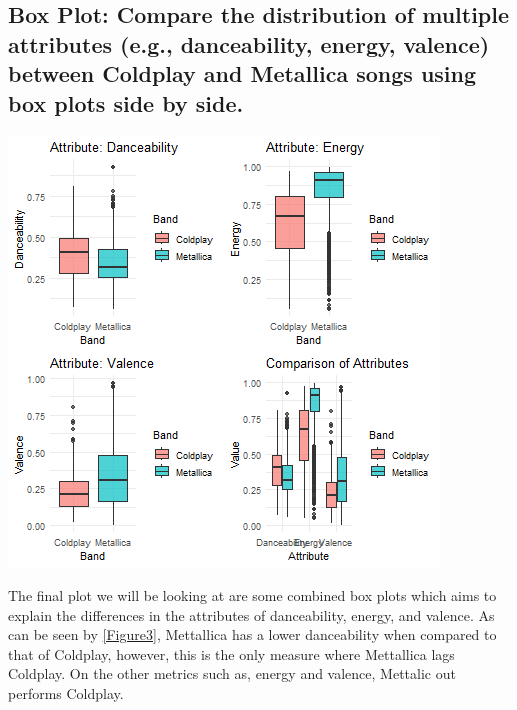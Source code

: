 \documentclass[11pt,preprint, authoryear]{elsarticle}
\let\origfigure\figure
\let\endorigfigure\endfigure
\renewenvironment{figure}[1][2] {
    \expandafter\origfigure\expandafter[H]
} {
    \endorigfigure
}
\numberwithin{equation}{section}
\numberwithin{figure}{section}
\numberwithin{table}{section}
\begin{document}
\hypertarget{box-plot-compare-the-distribution-of-multiple-attributes-e.g.-danceability-energy-valence-between-coldplay-and-metallica-songs-using-box-plots-side-by-side.}{%
\subsection{Box Plot: Compare the distribution of multiple attributes
(e.g., danceability, energy, valence) between Coldplay and Metallica
songs using box plots side by
side.}\label{box-plot-compare-the-distribution-of-multiple-attributes-e.g.-danceability-energy-valence-between-coldplay-and-metallica-songs-using-box-plots-side-by-side.}}

\begin{figure}[H]

{\centering \includegraphics{Question-3_files/figure-latex/Figure 3-1} 

}

\caption{Attribute distribution \label{Figure3}}\label{fig:Figure 3}
\end{figure}

The final plot we will be looking at are some combined box plots which
aims to explain the differences in the attributes of danceability,
energy, and valence. As can be seen by \ref{Figure3}, Mettallica has a
lower danceability when compared to that of Coldplay, however, this is
the only measure where Mettallica lags Coldplay. On the other metrics
such as, energy and valence, Mettalic out performs Coldplay.
\end{document}

